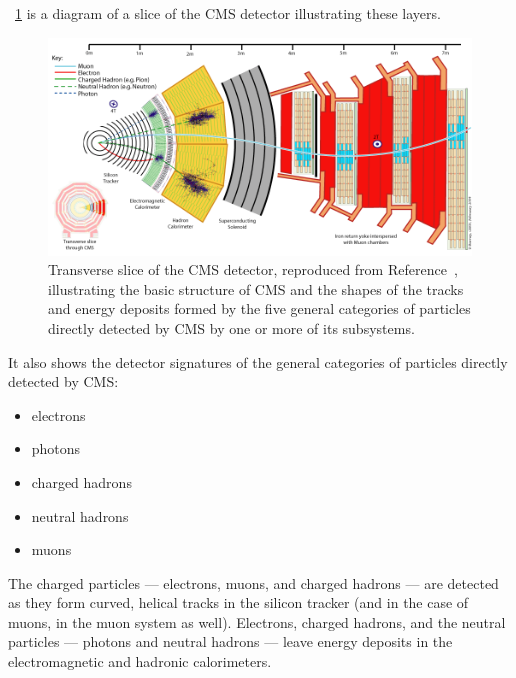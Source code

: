 \Fig~\ref{cms:interactive} is a diagram of a slice of the CMS detector illustrating these layers.
\begin{figure}[tpb]
  \centering
  \includegraphics[width=\textwidth]{figures/cms/CMSSlice.png}
  \caption{Transverse slice of the CMS detector, reproduced from Reference~\cite{Davis:2205172}, illustrating the basic structure of CMS and the shapes of the tracks and energy deposits formed by the five general categories of particles directly detected by CMS by one or more of its subsystems.}
  \label{cms:interactive}
\end{figure}
It also shows the detector signatures of the general categories of particles directly detected by CMS:
\begin{itemize}
  \item electrons
  \item photons
  \item charged hadrons
  \item neutral hadrons
  \item muons
\end{itemize}
The charged particles --- electrons, muons, and charged hadrons --- are detected as they form curved, helical tracks in the silicon tracker (and in the case of muons, in the muon system as well).
Electrons, charged hadrons, and the neutral particles --- photons and neutral hadrons --- leave energy deposits in the electromagnetic and hadronic calorimeters.

